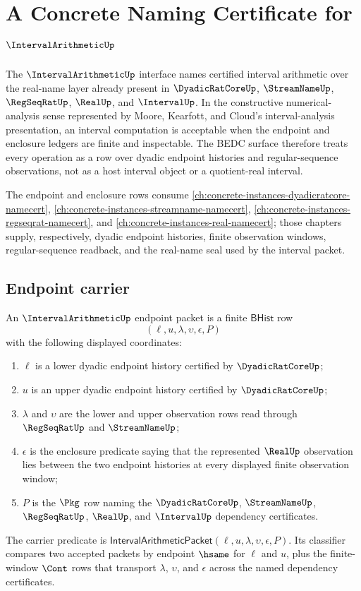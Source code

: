 \chapter{A Concrete Naming Certificate for $\IntervalArithmeticUp$}
\label{ch:concrete-instances-intervalarithmetic-namecert}

The $\IntervalArithmeticUp$ interface names certified interval arithmetic over the real-name layer already present in $\DyadicRatCoreUp$, $\StreamNameUp$, $\RegSeqRatUp$, $\RealUp$, and $\IntervalUp$. In the constructive numerical-analysis sense represented by Moore, Kearfott, and Cloud's interval-analysis presentation, an interval computation is acceptable when the endpoint and enclosure ledgers are finite and inspectable. The BEDC surface therefore treats every operation as a row over dyadic endpoint histories and regular-sequence observations, not as a host interval object or a quotient-real interval.

The endpoint and enclosure rows consume \autoref{ch:concrete-instances-dyadicratcore-namecert}, \autoref{ch:concrete-instances-streamname-namecert}, \autoref{ch:concrete-instances-regseqrat-namecert}, and \autoref{ch:concrete-instances-real-namecert}; those chapters supply, respectively, dyadic endpoint histories, finite observation windows, regular-sequence readback, and the real-name seal used by the interval packet.

\section{Endpoint carrier}
\label{sec:intervalarithmetic-endpoint-carrier}

\begin{definition}
\label{def:intervalarithmetic-bhist-carrier}
An $\IntervalArithmeticUp$ endpoint packet is a finite $\mathsf{BHist}$ row
$$
(\ell,u,\lambda,\upsilon,\epsilon,P)
$$
with the following displayed coordinates:
\begin{enumerate}
\item $\ell$ is a lower dyadic endpoint history certified by $\DyadicRatCoreUp$;
\item $u$ is an upper dyadic endpoint history certified by $\DyadicRatCoreUp$;
\item $\lambda$ and $\upsilon$ are the lower and upper observation rows read through $\RegSeqRatUp$ and $\StreamNameUp$;
\item $\epsilon$ is the enclosure predicate saying that the represented $\RealUp$ observation lies between the two endpoint histories at every displayed finite observation window;
\item $P$ is the $\Pkg$ row naming the $\DyadicRatCoreUp$, $\StreamNameUp$, $\RegSeqRatUp$, $\RealUp$, and $\IntervalUp$ dependency certificates.
\end{enumerate}
The carrier predicate is $\mathsf{IntervalArithmeticPacket}(\ell,u,\lambda,\upsilon,\epsilon,P)$. Its classifier compares two accepted packets by endpoint $\hsame$ for $\ell$ and $u$, plus the finite-window $\Cont$ rows that transport $\lambda$, $\upsilon$, and $\epsilon$ across the named dependency certificates.
\end{definition}


